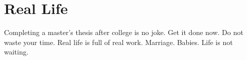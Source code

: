 \chapter{Real Life}
\label{get_it_done}

Completing a master's thesis after college is no joke.
Get it done now. 
Do not waste your time.
Real life is full of real work. Marriage. Babies.
Life is not waiting.

